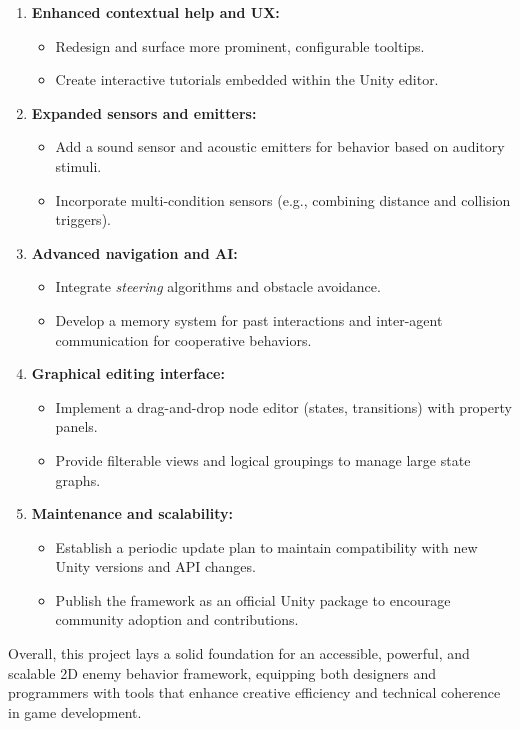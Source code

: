 \begin{enumerate}
  \item \textbf{Enhanced contextual help and UX:}
    \begin{itemize}
      \item Redesign and surface more prominent, configurable tooltips.
      \item Create interactive tutorials embedded within the Unity editor.
    \end{itemize}
  \item \textbf{Expanded sensors and emitters:}
    \begin{itemize}
      \item Add a sound sensor and acoustic emitters for behavior based on auditory stimuli.
      \item Incorporate multi-condition sensors (e.g., combining distance and collision triggers).
    \end{itemize}
  \item \textbf{Advanced navigation and AI:}
    \begin{itemize}
      \item Integrate \emph{steering} algorithms and obstacle avoidance.
      \item Develop a memory system for past interactions and inter-agent communication for cooperative behaviors.
    \end{itemize}
  \item \textbf{Graphical editing interface:}
    \begin{itemize}
      \item Implement a drag-and-drop node editor (states, transitions) with property panels.
      \item Provide filterable views and logical groupings to manage large state graphs.
    \end{itemize}
  \item \textbf{Maintenance and scalability:}
    \begin{itemize}
      \item Establish a periodic update plan to maintain compatibility with new Unity versions and API changes.
      \item Publish the framework as an official Unity package to encourage community adoption and contributions.
    \end{itemize}
\end{enumerate}

Overall, this project lays a solid foundation for an accessible, powerful, and scalable 2D enemy behavior framework, equipping both designers and programmers with tools that enhance creative efficiency and technical coherence in game development.
